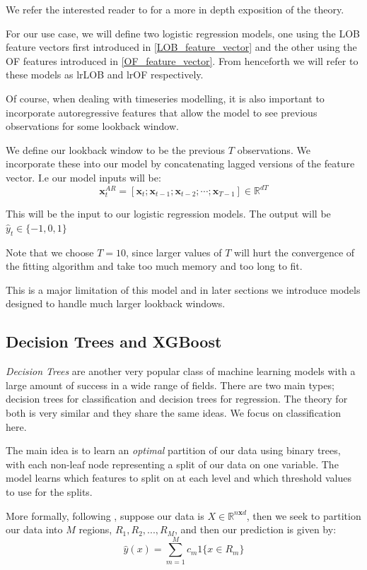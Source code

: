 \documentclass[a4paper, oneside, notitlepage]{book}
\begin{document}
We refer the interested reader to \cite{HASTIE2001} for a more in depth exposition of the theory.

For our use case, we will define two logistic regression models, one using the LOB feature vectors first introduced in \ref{LOB_feature_vector}
and the other using the OF features introduced in \ref{OF_feature_vector}. 
From henceforth we will refer to these models as lrLOB and lrOF respectively.

Of course, when dealing with timeseries modelling, it is also important to incorporate autoregressive
features that allow the model to see previous observations for some lookback window.

We define our lookback window to be the previous $T$ observations. We incorporate these into
our model by concatenating lagged versions of the feature vector. I.e our model inputs will be:
\begin{equation}
    \bm{x}^{AR}_t = [\bm{x}_t; \bm{x}_{t-1}; \bm{x}_{t-2}; \cdots; \bm{x}_{T-1}] \in  \mathbb{R}^{dT}\label{AR_features}
\end{equation}

This will be the input to our logistic regression models.
The output will be $\hat{y}_t \in \{-1, 0, 1\}$

Note that we choose $T=10$, since larger values of $T$ will hurt the convergence
of the fitting algorithm and take too much memory and too long to fit.

This is a major limitation of this model and in later sections we introduce models
designed to handle much larger lookback windows.

\subsection{Decision Trees and XGBoost}
\textit{Decision Trees} are another very popular class of machine learning models with a
large amount of success in a wide range of fields. There are two main types; decision trees
for classification and decision trees for regression. The theory for both is very similar
and they share the same ideas. We focus on classification here.

The main idea is to learn an \textit{optimal} partition of our data using binary trees,
with each non-leaf node representing a split of our data on one variable.
The model learns which features to split on at each level and which threshold values to use for the splits.


More formally, following \cite{HASTIE2001}, suppose our data is $X \in  \mathbb{R}^{n \bm{x} d}$, then
we seek to partition our data into $M$ regions, $R_1, R_2, ..., R_M$, and then our prediction is given by:
\begin{equation}
    \hat{y}(x) = \sum_{m=1}^{M} c_m 1\{x \in  R_m\} 
\end{equation}
\end{document}

